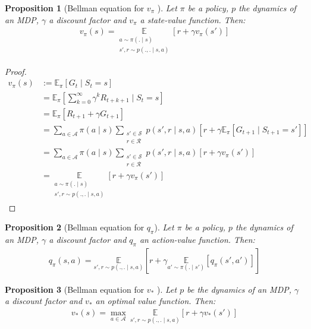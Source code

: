 \documentclass[11pt, a4paper, bibliography=totoc]{report}
\newcommand{\E}[2]{\mathbb{E}_{#1} \left[ #2 \right] }
\newtheorem{proposition}{Proposition}
\begin{document}
\begin{proposition}[Bellman equation for $ v_\pi $ {\cite[p.~59]{Sutton2018}}]
	Let $ \pi $ be a policy, $ p $ the dynamics of an MDP, $ \gamma $ a discount factor and $ v_\pi $ a state-value function. Then:
	\begin{align}
		v_\pi(s) = \underset{\substack{a \sim \pi(. \mid s) \\ s', r \sim p(., . \mid s, a) }}{\mathbb{E}} \left[ r + \gamma v_\pi(s') \right]
	\end{align}
\end{proposition}
\begin{proof}
	\begin{align*}
		v_\pi(s) &:= \E{\pi}{G_t \mid S_t = s} \\
		         &= \E{\pi}{\sum_{k=0}^{\infty} \gamma^k R_{t+k+1} \mid S_t = s} \\
		         &= \E{\pi}{R_{t+1} + \gamma G_{t+1}} \\
		         &= \sum_{a \in \mathcal{A}} \pi(a \mid s) \sum_{\substack{s' \in \mathcal{S} \\ r \in \mathcal{R}}} p(s', r \mid s, a) \left[ r + \gamma \E{\pi}{G_{t+1} \mid S_{t+1} = s'} \right] \\
		         &= \sum_{a \in \mathcal{A}} \pi(a \mid s) \sum_{\substack{s' \in \mathcal{S} \\ r \in \mathcal{R}}} p(s', r \mid s, a) \left[ r + \gamma  v_\pi(s') \right] \\
		         &= \underset{\substack{a \sim \pi(. \mid s) \\ s', r \sim p(., . \mid s, a) }}{\mathbb{E}} \left[ r + \gamma v_\pi(s') \right]
	\end{align*}
\end{proof}

\begin{proposition}[Bellman equation for $ q_\pi $]
	Let $ \pi $ be a policy, $ p $ the dynamics of an MDP, $ \gamma $ a discount factor and $ q_\pi $ an action-value function. Then:
	\begin{align}
	q_\pi(s, a) = \underset{s', r \sim p(., . \mid s, a)}{\mathbb{E}} \left[ r + \gamma \underset{a' \sim \pi(.\mid s')}{\mathbb{E}}\left[q_\pi(s', a')\right] \right]
	\end{align}
\end{proposition}

\begin{proposition}[Bellman equation for $ v_* $ {\cite[p.~63]{Sutton2018}}]
	Let $ p $ be the dynamics of an MDP, $ \gamma $ a discount factor and $ v_* $ an optimal value function. Then:
	\begin{align}
	v_*(s) = \max_{a \in \mathcal{A}} ~ \underset{s', r \sim p(., . \mid s, a)}{\mathbb{E}} \left[ r + \gamma v_*(s') \right]
	\end{align}
\end{proposition}
\end{document}
